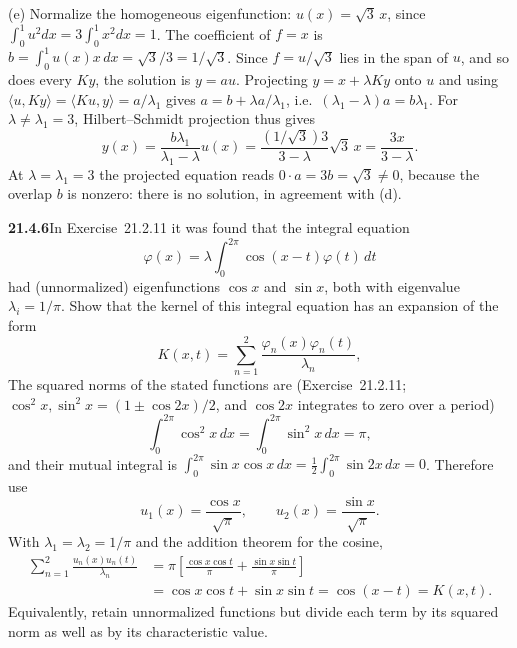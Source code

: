 (e) Normalize the homogeneous eigenfunction:
$u(x)=\sqrt3\,x$, since $\int_0^1u^2dx=3\int_0^1x^2dx=1$.
The coefficient of $f=x$ is
$b=\int_0^1u(x)x\,dx=\sqrt3/3=1/\sqrt3$.
Since $f=u/\sqrt3$ lies in the span of $u$, and so does every $Ky$,
the solution is $y=au$. Projecting $y=x+\lambda Ky$ onto $u$ and
using $\langle u,Ky\rangle=\langle Ku,y\rangle=a/\lambda_1$ gives
$a=b+\lambda a/\lambda_1$, i.e.\ $(\lambda_1-\lambda)a=b\lambda_1$.
For $\lambda\ne\lambda_1=3$, Hilbert--Schmidt projection thus gives
\[
y(x)=\frac{b\lambda_1}{\lambda_1-\lambda}u(x)
=\frac{(1/\sqrt3)3}{3-\lambda}\sqrt3\,x
=\frac{3x}{3-\lambda}.
\]
At $\lambda=\lambda_1=3$ the projected equation reads
$0\cdot a=3b=\sqrt3\ne0$, because the overlap $b$ is nonzero: there is
no solution, in agreement with (d).


\par\bigskip
\noindent\textbf{21.4.6}\quad In Exercise~21.2.11 it was found
that the integral equation
\[
\varphi(x)=\lambda\int_{0}^{2\pi}\cos(x-t)\varphi(t)\,dt
\]
had (unnormalized) eigenfunctions $\cos x$ and $\sin x$, both with
eigenvalue $\lambda_{i}=1/\pi$. Show that the kernel of this
integral equation has an expansion of the form
\[
K(x,t)=\sum_{n=1}^{2}\frac{\varphi_{n}(x)\varphi_{n}(t)}
{\lambda_{n}},
\]
\solution
The squared norms of the stated functions are (Exercise~21.2.11;
$\cos^2x,\sin^2x=(1\pm\cos2x)/2$, and $\cos2x$ integrates to zero
over a period)
\[
\int_0^{2\pi}\cos^2x\,dx
=\int_0^{2\pi}\sin^2x\,dx=\pi,
\]
and their mutual integral is
$\int_0^{2\pi}\sin x\cos x\,dx=\frac12\int_0^{2\pi}\sin2x\,dx=0$.
Therefore use
\[
u_1(x)=\frac{\cos x}{\sqrt\pi},\qquad
u_2(x)=\frac{\sin x}{\sqrt\pi}.
\]
With $\lambda_1=\lambda_2=1/\pi$ and the addition theorem for the
cosine,
\[
\begin{aligned}
\sum_{n=1}^2\frac{u_n(x)u_n(t)}{\lambda_n}
&=\pi\left[\frac{\cos x\cos t}{\pi}
+\frac{\sin x\sin t}{\pi}\right]\\
&=\cos x\cos t+\sin x\sin t
=\boxed{\cos(x-t)=K(x,t)}.
\end{aligned}
\]
Equivalently, retain unnormalized functions but divide each term by
its squared norm as well as by its characteristic value.


